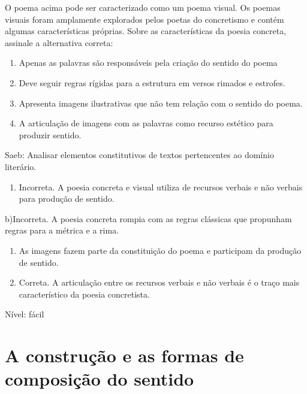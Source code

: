 {{\begin{escolha}
O poema acima pode ser caracterizado como um poema visual. Os poemas
visuais foram amplamente explorados pelos poetas do concretismo e contém
algumas características próprias. Sobre as características da poesia
concreta, assinale a alternativa correta:

\begin{enumerate}
\def\labelenumi{\arabic{enumi}.}
\item
  Apenas as palavras são responsáveis pela criação do sentido do poema
\item
  Deve seguir regras rígidas para a estrutura em versos rimados e
  estrofes.
\item
  Apresenta imagens ilustrativas que não tem relação com o sentido do
  poema.
\item
  A articulação de imagens com as palavras como recurso estético para
  produzir sentido.
\end{enumerate}

Saeb: Analisar elementos constitutivos de textos pertencentes ao domínio
literário.

\begin{enumerate}
\def\labelenumi{\arabic{enumi}.}
\tightlist
\item
  Incorreta. A poesia concreta e visual utiliza de recursos verbais e
  não verbais para produção de sentido.
\end{enumerate}

b)Incorreta. A poesia concreta rompia com as regras clássicas que
propunham regras para a métrica e a rima.

\begin{enumerate}
\def\labelenumi{\arabic{enumi}.}
\item
  As imagens fazem parte da constituição do poema e participam da
  produção de sentido.
\item
  Correta. A articulação entre os recursos verbais e não verbais é o
  traço mais característico da poesia concretista.
\end{enumerate}

Nível: fácil


\chapter{A construção e as formas de composição do sentido}


\begin{itemize}
  

\end{itemize}
\end{escolha}}}
